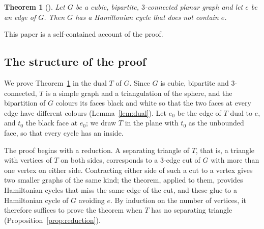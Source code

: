 \documentclass[a4paper]{amsart}
\numberwithin{equation}{section}
\newtheorem{theorem}[equation]{Theorem}
\theoremstyle{definition}
\begin{document}
\begin{theorem}[{\cite[Corollary~7.1]{OpenAI}}]\label{thm:main}
Let $G$ be a cubic, bipartite, $3$-connected planar graph and let $e$ be an edge of $G$.
Then $G$ has a Hamiltonian cycle that does not contain $e$.
\end{theorem}

This paper is a self-contained account of the proof.

\subsection*{The structure of the proof}
We prove Theorem~\ref{thm:main} in the dual $T$ of $G$.
Since $G$ is cubic, bipartite and $3$-connected, $T$ is a simple graph and a triangulation of the sphere, and the bipartition of $G$ colours its faces black and white so that the two faces at every edge have different colours (Lemma~\ref{lem:dual}).
Let $e_0$ be the edge of $T$ dual to $e$, and $t_0$ the black face at $e_0$; we draw $T$ in the plane with $t_0$ as the unbounded face, so that every cycle has an inside.

The proof begins with a reduction.
A separating triangle of $T$, that is, a triangle with vertices of $T$ on both sides, corresponds to a $3$-edge cut of $G$ with more than one vertex on either side.
Contracting either side of such a cut to a vertex gives two smaller graphs of the same kind; the theorem, applied to them, provides Hamiltonian cycles that miss the same edge of the cut, and these glue to a Hamiltonian cycle of $G$ avoiding $e$.
By induction on the number of vertices, it therefore suffices to prove the theorem when $T$ has no separating triangle (Proposition~\ref{prop:reduction}).
\end{document}
